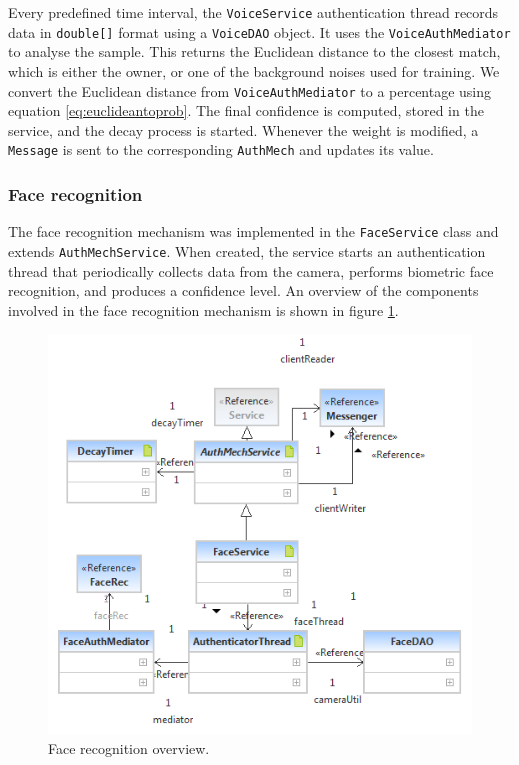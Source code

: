 Every predefined time interval, the {\tt VoiceService} authentication thread records data in {\tt double[]} format using a {\tt VoiceDAO} object. It uses the {\tt VoiceAuthMediator} to analyse the sample. This returns the Euclidean distance to the closest match, which is either the owner, or one of the background noises used for training. We convert the Euclidean distance from {\tt VoiceAuthMediator} to a percentage using equation \ref{eq:euclideantoprob}. The final confidence is computed, stored in the service, and the decay process is started. Whenever the weight is modified, a {\tt Message} is sent to the corresponding {\tt AuthMech} and updates its value. 
 
\subsubsection{Face recognition}
\label{implface}
The face recognition mechanism was implemented in the {\tt FaceService} class and extends {\tt AuthMechService}. When created, the service starts an authentication thread that periodically collects data from the camera, performs biometric face recognition, and produces a confidence level. An overview of the components involved in the face recognition mechanism is shown in figure \ref{fig:face}.
\begin{figure}[h]
    \centering
    \includegraphics[width=\textwidth]{Pictures/face-brief}
    \caption{Face recognition overview.}
    \label{fig:face}
\end{figure}

